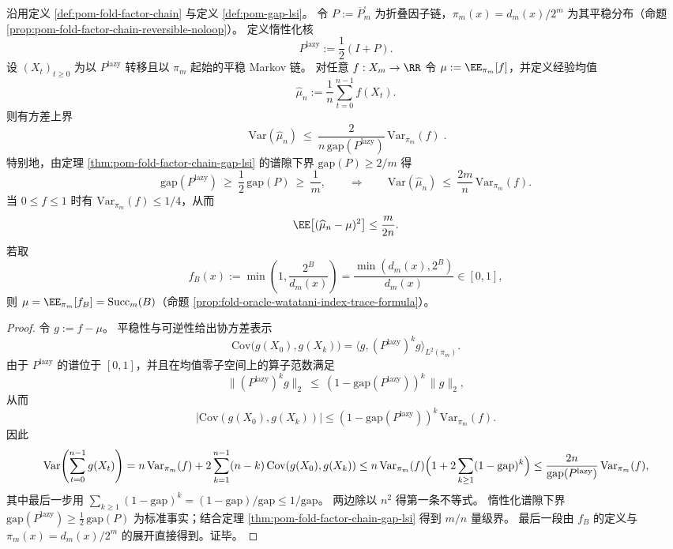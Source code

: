 \begin{proposition}\label{prop:pom-fold-factor-chain-effective-sample-size}
沿用定义 \ref{def:pom-fold-factor-chain} 与定义 \ref{def:pom-gap-lsi}。
令 \(P:=\overline P^{\square}_m\) 为折叠因子链，\(\pi_m(x)=d_m(x)/2^m\) 为其平稳分布（命题 \ref{prop:pom-fold-factor-chain-reversible-noloop}）。
定义惰性化核
\[
P^{\mathrm{lazy}}:=\frac12(I+P).
\]
设 \((X_t)_{t\ge 0}\) 为以 \(P^{\mathrm{lazy}}\) 转移且以 \(\pi_m\) 起始的平稳 Markov 链。
对任意 \(f:X_m\to\RR\) 令 \(\mu:=\EE_{\pi_m}[f]\)，并定义经验均值
\[
\widehat\mu_n:=\frac{1}{n}\sum_{t=0}^{n-1} f(X_t).
\]
则有方差上界
\[
\boxed{\;
\mathrm{Var}(\widehat\mu_n)\ \le\ \frac{2}{n\,\mathrm{gap}(P^{\mathrm{lazy}})}\,\mathrm{Var}_{\pi_m}(f)\; }.
\]
特别地，由定理 \ref{thm:pom-fold-factor-chain-gap-lsi} 的谱隙下界 \(\mathrm{gap}(P)\ge 2/m\) 得
\[
\mathrm{gap}(P^{\mathrm{lazy}})\ \ge\ \frac12\,\mathrm{gap}(P)\ \ge\ \frac{1}{m},
\qquad\Longrightarrow\qquad
\mathrm{Var}(\widehat\mu_n)\ \le\ \frac{2m}{n}\,\mathrm{Var}_{\pi_m}(f).
\]
当 \(0\le f\le 1\) 时有 \(\mathrm{Var}_{\pi_m}(f)\le 1/4\)，从而
\[
\EE\bigl[(\widehat\mu_n-\mu)^2\bigr]\le \frac{m}{2n}.
\]
若取
\[
f_B(x):=\min\!\left(1,\frac{2^B}{d_m(x)}\right)=\frac{\min(d_m(x),2^B)}{d_m(x)}\in[0,1],
\]
则 \(\mu=\EE_{\pi_m}[f_B]={\rm Succ}_m(B)\)（命题 \ref{prop:fold-oracle-watatani-index-trace-formula}）。
\end{proposition}
\begin{proof}
令 \(g:=f-\mu\)。
平稳性与可逆性给出协方差表示
\[
\mathrm{Cov}\bigl(g(X_0),g(X_k)\bigr)=\langle g,(P^{\mathrm{lazy}})^k g\rangle_{L^2(\pi_m)}.
\]
由于 \(P^{\mathrm{lazy}}\) 的谱位于 \([0,1]\)，并且在均值零子空间上的算子范数满足
\[
\bigl\|(P^{\mathrm{lazy}})^k g\bigr\|_2\ \le\ (1-\mathrm{gap}(P^{\mathrm{lazy}}))^k\,\|g\|_2,
\]
从而
\[
\bigl|\mathrm{Cov}(g(X_0),g(X_k))\bigr|
\le (1-\mathrm{gap}(P^{\mathrm{lazy}}))^k\,\mathrm{Var}_{\pi_m}(f).
\]
因此
\[
\mathrm{Var}\!\left(\sum_{t=0}^{n-1}g(X_t)\right)
=n\,\mathrm{Var}_{\pi_m}(f)+2\sum_{k=1}^{n-1}(n-k)\,\mathrm{Cov}(g(X_0),g(X_k))
\le n\,\mathrm{Var}_{\pi_m}(f)\Bigl(1+2\sum_{k\ge 1}(1-\mathrm{gap})^k\Bigr)
\le \frac{2n}{\mathrm{gap}(P^{\mathrm{lazy}})}\,\mathrm{Var}_{\pi_m}(f),
\]
其中最后一步用 \(\sum_{k\ge 1}(1-\mathrm{gap})^k=(1-\mathrm{gap})/\mathrm{gap}\le 1/\mathrm{gap}\)。
两边除以 \(n^2\) 得第一条不等式。
惰性化谱隙下界 \(\mathrm{gap}(P^{\mathrm{lazy}})\ge \frac12\,\mathrm{gap}(P)\) 为标准事实；结合定理 \ref{thm:pom-fold-factor-chain-gap-lsi} 得到 \(m/n\) 量级界。
最后一段由 \(f_B\) 的定义与 \(\pi_m(x)=d_m(x)/2^m\) 的展开直接得到。证毕。
\end{proof}

